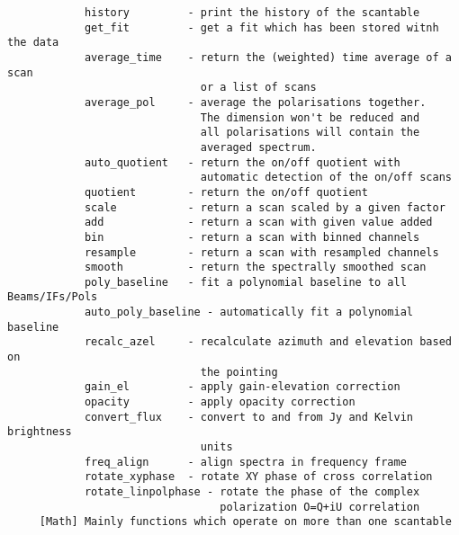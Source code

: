\documentclass[11pt]{article}
\begin{document}
\begin{verbatim}
            history         - print the history of the scantable
            get_fit         - get a fit which has been stored witnh the data
            average_time    - return the (weighted) time average of a scan
                              or a list of scans
            average_pol     - average the polarisations together.
                              The dimension won't be reduced and
                              all polarisations will contain the
                              averaged spectrum.
            auto_quotient   - return the on/off quotient with
                              automatic detection of the on/off scans
            quotient        - return the on/off quotient
            scale           - return a scan scaled by a given factor
            add             - return a scan with given value added
            bin             - return a scan with binned channels
            resample        - return a scan with resampled channels
            smooth          - return the spectrally smoothed scan
            poly_baseline   - fit a polynomial baseline to all Beams/IFs/Pols
            auto_poly_baseline - automatically fit a polynomial baseline
            recalc_azel     - recalculate azimuth and elevation based on
                              the pointing
            gain_el         - apply gain-elevation correction
            opacity         - apply opacity correction
            convert_flux    - convert to and from Jy and Kelvin brightness
                              units
            freq_align      - align spectra in frequency frame
            rotate_xyphase  - rotate XY phase of cross correlation
            rotate_linpolphase - rotate the phase of the complex
                                 polarization O=Q+iU correlation
     [Math] Mainly functions which operate on more than one scantable


\end{verbatim}
\end{document}
